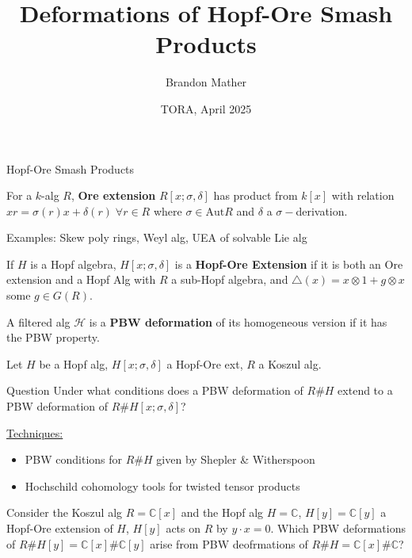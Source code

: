 \documentclass{beamer}
\title{Deformations of Hopf-Ore Smash Products}
\author{Brandon Mather}
\date{TORA, April 2025}
\begin{document}
\maketitle

\begin{frame}{Hopf-Ore Smash Products}
\begin{definition}
    For a \(k\)-alg \(R\), \textbf{Ore extension} \(R[x;\sigma,\delta]\) has product from \(k[x]\) with relation \(xr=\sigma(r)x+\delta(r)\;\forall r\in R\) where \(\sigma\in \text{Aut}R\) and \(\delta\) a \(\sigma-\)derivation. 
\end{definition}
Examples: Skew poly rings, Weyl alg, UEA of solvable Lie alg
\begin{definition}
    If \(H\) is a Hopf algebra, \(H[x;\sigma,\delta]\) is a \textbf{Hopf-Ore Extension} if it is both an Ore extension and a Hopf Alg with \(R\) a sub-Hopf algebra, and \(\triangle(x)=x\otimes 1+g\otimes x\) some \(g\in G(R)\).
\end{definition}
\begin{definition}
    A filtered alg \(\mathcal{H}\) is a \textbf{PBW deformation} of its homogeneous version if it has the PBW property.
\end{definition}
\end{frame}

\begin{frame} 
    Let \(H\) be a Hopf alg, \(H[x;\sigma,\delta]\) a Hopf-Ore ext, \(R\) a Koszul alg.
\begin{beamerboxesrounded}{Question}
    Under what conditions does a PBW deformation of \(R\#H\) extend to a PBW deformation of \(R\#H[x;\sigma,\delta]\)?
\end{beamerboxesrounded}

\underline{Techniques:}
\begin{itemize}
    \item PBW conditions for \(R\#H\) given by Shepler \& Witherspoon
    \item Hochschild cohomology tools for twisted tensor products
\end{itemize}
\begin{example}
    Consider the Koszul alg \(R=\mathbb{C}[x]\) and the Hopf alg \(H=\mathbb{C}\), \(H[y]=\mathbb{C}[y]\) a Hopf-Ore extension of \(H\), \(H[y]\) acts on \(R\) by \(y\cdot x=0\).
    Which PBW deformations of \(R\#H[y]=\mathbb{C}[x]\#\mathbb{C}[y]\) arise from PBW deofrmations of \(R\#H=\mathbb{C}[x]\#\mathbb{C}\)?
\end{example}
\end{frame}
\end{document}
